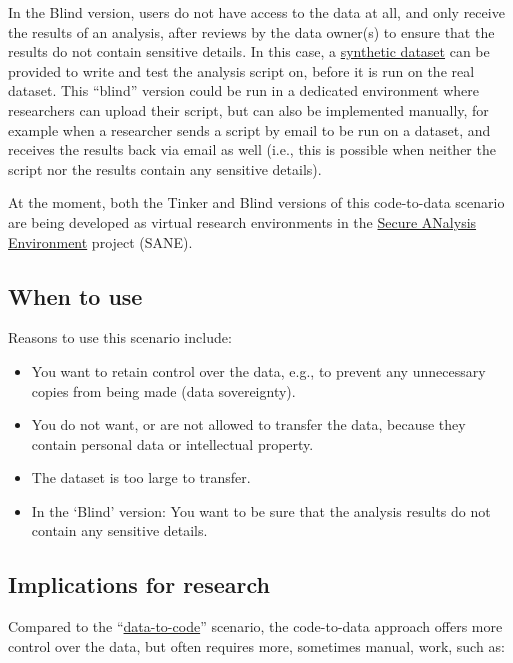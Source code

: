 \documentclass[
]{book}
\providecommand{\tightlist}{%
  \setlength{\itemsep}{0pt}\setlength{\parskip}{0pt}}
\begin{document}
In the Blind version, users do not have access to the data
at all, and only receive the results of an analysis, after reviews by the data
owner(s) to ensure that the results do not contain sensitive details. In this
case, a \protect\hyperlink{synthetic-data}{synthetic dataset} can be provided to write and test
the analysis script on, before it is run on the real dataset. This ``blind''
version could be run in a dedicated environment where researchers can upload
their script, but can also be implemented manually, for example when a
researcher sends a script by email to be run on a dataset, and receives the
results back via email as well (i.e., this is possible when neither the script
nor the results contain any sensitive details).

At the moment, both the Tinker and Blind versions of this code-to-data scenario
are being developed as virtual research environments in the
\href{https://www.surf.nl/en/news/sane-secure-data-environment-for-social-sciences-and-humanities}{Secure ANalysis Environment}
project (SANE).

\hypertarget{when-to-use-1}{%
\subsection{When to use}\label{when-to-use-1}}

Reasons to use this scenario include:

\begin{itemize}
\tightlist
\item
  You want to retain control over the data, e.g., to prevent any unnecessary
  copies from being made (data sovereignty).
\item
  You do not want, or are not allowed to transfer the data, because they contain
  personal data or intellectual property.
\item
  The dataset is too large to transfer.
\item
  In the `Blind' version: You want to be sure that the analysis results do not
  contain any sensitive details.
\end{itemize}

\hypertarget{implications-for-research-1}{%
\subsection{Implications for research}\label{implications-for-research-1}}

Compared to the ``\protect\hyperlink{data-to-code}{data-to-code}'' scenario, the code-to-data
approach offers more control over the data, but often requires more, sometimes
manual, work, such as:
\end{document}
